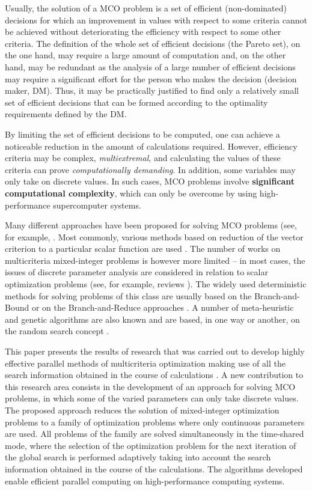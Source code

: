 \documentclass{svproc}
\begin{document}
Usually, the solution of a MCO problem is a set of efficient (non-dominated) decisions for which an improvement in values with respect to some criteria cannot be achieved without deteriorating the efficiency with respect to some other criteria. The definition of the whole set of efficient decisions (the Pareto set), on the one hand, may require a large amount of computation and, on the other hand, may be redundant as the analysis of a large number of efficient decisions may require a significant effort for the person who makes the decision (decision maker, DM). Thus, it may be practically justified to find only a relatively small set of efficient decisions that can be formed according to the optimality requirements defined by the DM. 

By limiting the set of efficient decisions to be computed, one can achieve a noticeable reduction in the amount of calculations required. However, efficiency criteria may be complex, \textit{multiextremal}, and calculating the values of these criteria can prove \textit{computationally demanding}. In addition, some variables may only take on discrete values. In such cases, MCO problems involve \textbf{significant computational complexity}, which can only be overcome by using high-performance supercomputer systems.

Many different approaches have been proposed for solving MCO problems (see, for example, \cite{c3,c6,c10,c11}.  Most commonly, various methods based on reduction of the vector criterion to a particular scalar function are used \cite{c2,c12}. The number of works on multicriteria mixed-integer problems is however more limited -- in most cases, the issues of discrete parameter analysis are considered in relation to scalar optimization problems (see, for example, reviews \cite{c13,c14}). The widely used deterministic methods for solving problems of this class are usually based on the Branch-and-Bound \cite{c15} or on the Branch-and-Reduce approaches \cite{c16}. A number of meta-heuristic and genetic algorithms are also known and are based, in one way or another, on the random search concept \cite{c17,c18}.

This paper presents the results of research that was carried out to develop highly effective parallel methods of multicriteria optimization making use of all the search information obtained in the course of calculations \cite{c19,c20,c21}. A new contribution to this research area consists in the development of an approach for solving MCO problems, in which some of the varied parameters can only take discrete values. The proposed approach reduces the solution of mixed-integer optimization problems to a family of optimization problems where only continuous parameters are used. All problems of the family are solved simultaneously in the time-shared mode, where the selection of the optimization problem for the next iteration of the global search is performed adaptively taking into account the search information obtained in the course of the calculations. The algorithms developed enable efficient parallel computing on high-performance computing systems.
\end{document}
